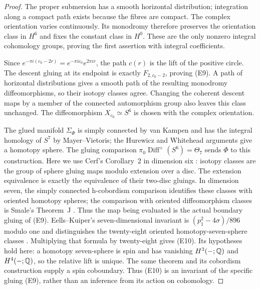 \begin{proof}
The proper submersion has a smooth horizontal distribution; integration
along a compact path exists because the fibres are compact. The
complex orientation varies continuously. Its monodromy therefore
preserves the orientation class in $H^6$ and fixes the constant
class in $H^0$. These are the only nonzero integral cohomology
groups, proving the first assertion with integral coefficients.

Since $e^{-\pi i(c_0-2r)}=e^{-\pi ic_0}e^{2\pi ir}$, the path
$c(r)$ is the lift of the positive circle. The descent gluing at
its endpoint is exactly $F_{2,c_0-2}$, proving (E9). A path of
horizontal distributions gives a smooth path of the resulting
monodromy diffeomorphisms, so their isotopy classes agree. Changing
the coherent descent maps by a member of the connected automorphism
group also leaves this class unchanged. The diffeomorphism
$X_{c_0}\simeq S^6$ is chosen with the complex orientation.

The glued manifold $\Sigma_\Phi$ is simply connected by van Kampen
and has the integral homology of $S^7$ by Mayer--Vietoris; the
Hurewicz and Whitehead arguments give a homotopy sphere. The
gluing comparison $\pi_0\operatorname{Diff}^+(S^6)=\Theta_7$
sends $\Phi$ to this construction. Here we use Cerf's
Corollary~2 in dimension six \cite[p.~76]{Cerf71}: isotopy classes
are the group of sphere gluing maps modulo extension over a disc.
The extension equivalence is exactly the equivalence of their
two-disc gluings. In dimension seven, the simply connected
h-cobordism comparison identifies these classes with oriented
homotopy spheres; the comparison with oriented diffeomorphism
classes is Smale's Theorem~J \cite[pp.~393--394]{Smale61}.
Thus the map being evaluated is the actual boundary gluing of (E9).
Eells--Kuiper's
seven-dimensional invariant is
$(p_1^2-4\sigma)/896$ modulo one and distinguishes the twenty-eight
oriented homotopy-seven-sphere classes
\cite[Section 7, pp.~100--103]{EK62}. Multiplying that formula by
twenty-eight gives (E10). Its hypotheses hold here: a homotopy
seven-sphere is spin and has vanishing $H^3(-;\mathbb Q)$ and
$H^4(-;\mathbb Q)$, so the relative lift is unique. The same theorem
and its cobordism construction supply a spin coboundary. Thus
(E10) is an invariant of the specific gluing (E9), rather than an
inference from its action on cohomology.
\end{proof}


